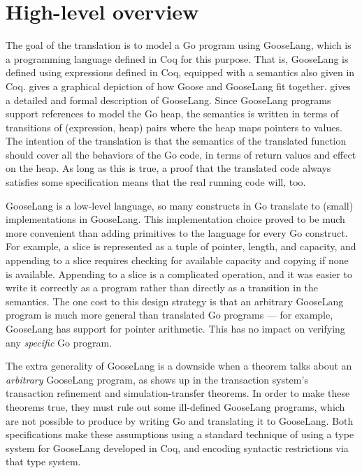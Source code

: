 \section{High-level overview}

The goal of the translation is to model a Go program using GooseLang,
which is a programming language defined in Coq for this purpose. That is,
GooseLang is defined using expressions defined in Coq, equipped with a
semantics also given in Coq.  gives a graphical
depiction of how Goose and GooseLang fit together.  gives a
detailed and formal description of GooseLang.  Since GooseLang programs support
references
to model the Go heap, the semantics is written in terms of transitions
of (expression, heap) pairs where the heap maps pointers to values. The
intention of the translation is that the semantics of the translated
function should cover all the behaviors of the Go code, in terms of
return values and effect on the heap. As long as this is true, a proof
that the translated code always satisfies some specification means that
the real running code will, too.

GooseLang is a low-level language, so many constructs in Go translate to
(small) implementations in GooseLang. This implementation choice proved
to be much more convenient than adding primitives to the language for
every Go construct. For example, a slice is represented as a tuple of
pointer, length, and capacity, and appending to a slice requires
checking for available capacity and copying if none is available.
Appending to a slice is a complicated operation, and it was easier to
write it correctly as a program rather than directly as a transition in
the semantics. The one cost to this design strategy is that an arbitrary
GooseLang program is much more general than translated Go programs --- for
example, GooseLang has support for pointer arithmetic. This
has no impact on verifying any \emph{specific} Go program.

The extra generality of GooseLang is a downside when a theorem talks about an
\emph{arbitrary} GooseLang program, as shows up in the transaction system's
transaction refinement and simulation-transfer theorems. In order to make these
theorems true, they must rule out
some ill-defined GooseLang programs, which are
not possible to produce by writing Go and translating it to GooseLang. Both
specifications make these assumptions using a
standard technique of using a type system for GooseLang developed in Coq, and encoding
syntactic restrictions via that type system.

